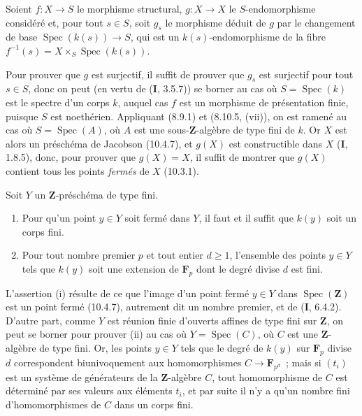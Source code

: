 Soient $f:X\to S$ le morphisme structural, $g:X\to X$ le $S$-endomorphisme
considéré et, pour tout $s\in S$, soit $g_s$ le morphisme déduit de $g$ par le
changement de base $\operatorname{Spec}(k(s))\to S$, qui est un
$k(s)$-endomorphisme de la fibre
$f^{-1}(s)=X\times_S\operatorname{Spec}(k(s))$.

Pour prouver que $g$ est surjectif, il suffit de prouver que $g_s$ est
surjectif pour tout $s\in S$, donc on peut (en vertu de (\textbf{I}, 3.5.7))
se borner au cas où $S=\operatorname{Spec}(k)$ est le spectre d'un corps $k$,
auquel cas $f$ est un morphisme de présentation finie, puisque $S$ est
noethérien. Appliquant (8.9.1) et (8.10.5, (vii)), on est ramené au cas où
$S=\operatorname{Spec}(A)$, où $A$ est une sous-$\mathbf Z$-algèbre de type
fini de $k$. Or $X$ est alors un préschéma de Jacobson (10.4.7), et $g(X)$ est
constructible dans $X$ (\textbf{I}, 1.8.5), donc, pour prouver que $g(X)=X$,
il suffit de montrer que $g(X)$ contient tous les points \emph{fermés} de $X$
(10.3.1).

\begin{lemma}[10.4.11.1]
\label{IV.10.4.11.1-fr}
Soit $Y$ un $\mathbf Z$-préschéma de type fini.
\begin{enumerate}[label=(\roman*)]
  \item Pour qu'un point $y\in Y$ soit fermé dans $Y$, il faut et il suffit
  que $k(y)$ soit un corps fini.
  \item Pour tout nombre premier $p$ et tout entier $d\geq1$, l'ensemble des
  points $y\in Y$ tels que $k(y)$ soit une extension de $\mathbf F_p$ dont le
  degré divise $d$ est fini.
\end{enumerate}
\end{lemma}

L'assertion (i) résulte de ce que l'image d'un point fermé $y\in Y$ dans
$\operatorname{Spec}(\mathbf Z)$ est un point fermé (10.4.7), autrement dit
un nombre premier, et de (\textbf{I}, 6.4.2). D'autre part, comme $Y$ est
réunion finie d'ouverts affines de type fini sur $\mathbf Z$, on peut se
borner pour prouver (ii) au cas où $Y=\operatorname{Spec}(C)$, où $C$ est une
$\mathbf Z$-algèbre de type fini. Or, les points $y\in Y$ tels que le degré de
$k(y)$ sur $\mathbf F_p$ divise $d$ correspondent biunivoquement aux
homomorphismes $C\to\mathbf F_{p^d}$~; mais si $(t_i)$ est un système de
générateurs de la $\mathbf Z$-algèbre $C$, tout homomorphisme de $C$ est
déterminé par ses valeurs aux éléments $t_i$, et par suite il n'y a qu'un
nombre fini d'homomorphismes de $C$ dans un corps fini.


